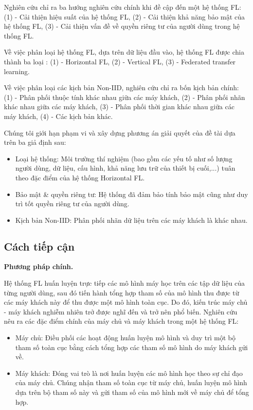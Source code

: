 Nghiên cứu \cite{yin2021comprehensive} chỉ ra ba hướng nghiên cứu chính khi đề cập đến một hệ thống FL: (1) - Cải thiện hiệu suất của hệ thống FL, (2) - Cải thiện khả năng bảo mật của hệ thống FL, (3) - Cải thiện vấn đề về quyền riêng tư của người dùng trong hệ thống FL.

Về việc phân loại hệ thống FL, dựa trên dữ liệu đầu vào, hệ thống FL được chia thành ba loại \cite{yin2021comprehensive}: (1) - Horizontal FL, (2) - Vertical FL, (3) - Federated transfer learning.

Về việc phân loại các kịch bản Non-IID, nghiên cứu \cite{zhu2021federated} chỉ ra bốn kịch bản chính: (1) - Phân phối thuộc tính khác nhau giữa các máy khách, (2) - Phân phối nhãn khác nhau giữa các máy khách, (3) - Phân phối thời gian khác nhau giữa các máy khách, (4) - Các kịch bản khác.

Chúng tôi giới hạn phạm vi và xây dựng phương án giải quyết của đề tài dựa trên ba giả định sau:

\begin{itemize}
    \item Loại hệ thống: Môi trường thí nghiệm (bao gồm các yếu tố như số lượng người dùng, dữ liệu, cấu hình, khả năng lưu trữ của thiết bị cuối,...) tuân theo đặc điểm của hệ thống Horizontal FL.
    \item Bảo mật \& quyền riêng tư: Hệ thống đã đảm bảo tính bảo mật cũng như duy trì tốt quyền riêng tư của người dùng.
    \item Kịch bản Non-IID: Phân phối nhãn dữ liệu trên các máy khách là khác nhau.
\end{itemize}

\subsection*{Cách tiếp cận}

\textbf{Phương pháp chính.}

Hệ thống FL huấn luyện trực tiếp các mô hình máy học trên các tập dữ liệu của từng người dùng, sau đó tiến hành tổng hợp tham số của mô hình thu được từ các máy khách này để thu được một mô hình toàn cục. Do đó, kiến trúc máy chủ - máy khách nghiễm nhiên trở được nghĩ đến và trở nên phổ biến. Nghiên cứu \cite{yin2021comprehensive} nêu ra các đặc điểm chính của máy chủ và máy khách trong một hệ thống FL:

\begin{itemize}
    \item Máy chủ: Điều phối các hoạt động huấn luyện mô hình và duy trì một bộ tham số toàn cục bằng cách tổng hợp các tham số mô hình do máy khách gửi về.
    \item Máy khách: Đóng vai trò là nơi huấn luyện các mô hình học theo sự chỉ đạo của máy chủ. Chúng nhận tham số toàn cục từ máy chủ, huấn luyện mô hình dựa trên bộ tham số này và gửi tham số của mô hình mới về máy chủ để tổng hợp.
\end{itemize}

